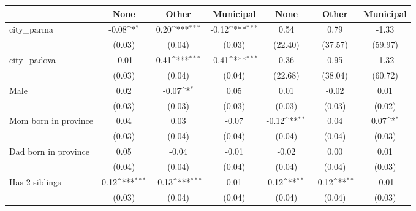 {
\def\sym#1{\ifmmode^{#1}\else\(^{#1}\)\fi}
\begin{tabular}{l*{6}{c}}
\toprule
                    &\multicolumn{1}{c}{None}&\multicolumn{1}{c}{Other}&\multicolumn{1}{c}{Municipal}&\multicolumn{1}{c}{None}&\multicolumn{1}{c}{Other}&\multicolumn{1}{c}{Municipal}\\
\midrule
city\_parma          &       -0.08\sym{*}  &        0.20\sym{***}&       -0.12\sym{***}&        0.54         &        0.79         &       -1.33         \\
                    &      (0.03)         &      (0.04)         &      (0.03)         &     (22.40)         &     (37.57)         &     (59.97)         \\
\addlinespace
city\_padova         &       -0.01         &        0.41\sym{***}&       -0.41\sym{***}&        0.36         &        0.95         &       -1.32         \\
                    &      (0.03)         &      (0.04)         &      (0.04)         &     (22.68)         &     (38.04)         &     (60.72)         \\
\addlinespace
Male                &        0.02         &       -0.07\sym{*}  &        0.05         &        0.01         &       -0.02         &        0.01         \\
                    &      (0.03)         &      (0.03)         &      (0.03)         &      (0.03)         &      (0.03)         &      (0.02)         \\
\addlinespace
Mom born in province&        0.04         &        0.03         &       -0.07         &       -0.12\sym{**} &        0.04         &        0.07\sym{*}  \\
                    &      (0.03)         &      (0.04)         &      (0.04)         &      (0.04)         &      (0.04)         &      (0.03)         \\
\addlinespace
Dad born in province&        0.05         &       -0.04         &       -0.01         &       -0.02         &        0.00         &        0.01         \\
                    &      (0.04)         &      (0.04)         &      (0.04)         &      (0.04)         &      (0.04)         &      (0.03)         \\
\addlinespace
Has 2 siblings      &        0.12\sym{***}&       -0.13\sym{***}&        0.01         &        0.12\sym{**} &       -0.12\sym{**} &       -0.01         \\
                    &      (0.03)         &      (0.04)         &      (0.04)         &      (0.04)         &      (0.04)         &      (0.03)         \\

\end{tabular}}
